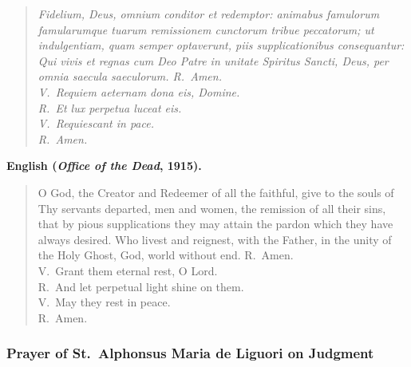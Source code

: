 \begin{quote}
\textit{Fidelium, Deus, omnium conditor et redemptor: animabus famulorum famularumque tuarum remissionem cunctorum tribue peccatorum; ut indulgentiam, quam semper optaverunt, piis supplicationibus consequantur: Qui vivis et regnas cum Deo Patre in unitate Spiritus Sancti, Deus, per omnia saecula saeculorum. R.\ Amen.}\\
\textit{V.\ Requiem aeternam dona eis, Domine.}\\
\textit{R.\ Et lux perpetua luceat eis.}\\
\textit{V.\ Requiescant in pace.}\\
\textit{R.\ Amen.}
\end{quote}

\textbf{English (\textit{Office of the Dead}, 1915).}

\begin{quote}
O God, the Creator and Redeemer of all the faithful, give to the souls of Thy servants departed, men and women, the remission of all their sins, that by pious supplications they may attain the pardon which they have always desired. Who livest and reignest, with the Father, in the unity of the Holy Ghost, God, world without end. R.\ Amen.\\
V.\ Grant them eternal rest, O Lord.\\
R.\ And let perpetual light shine on them.\\
V.\ May they rest in peace.\\
R.\ Amen.
\end{quote}

\subsubsection*{Prayer of St.\ Alphonsus Maria de Liguori on Judgment}

